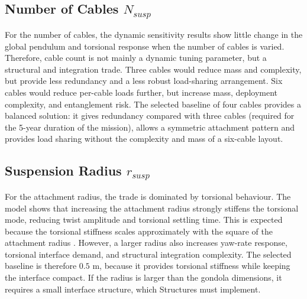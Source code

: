 \subsection{Number of Cables $N_{susp}$}
\label{subsec: Number of Cables}
For the number of cables, the dynamic sensitivity results show little change in the global pendulum and torsional response when the number of cables is varied. Therefore, cable count is not mainly a dynamic tuning parameter, but a structural and integration trade. Three cables would reduce mass and complexity, but provide less redundancy and a less robust load-sharing arrangement. Six cables would reduce per-cable loads further, but increase mass, deployment complexity, and entanglement risk. The selected baseline of four cables provides a balanced solution: it gives redundancy compared with three cables (required for the 5-year duration of the mission), allows a symmetric attachment pattern and provides load sharing without the complexity and mass of a six-cable layout.

\subsection{Suspension Radius $r_{susp}$}
\label{subsec: Suspension Radius}
For the attachment radius, the trade is dominated by torsional behaviour. The model shows that increasing the attachment radius strongly stiffens the torsional mode, reducing twist amplitude and torsional settling time. This is expected because the torsional stiffness scales approximately with the square of the attachment radius \cite{Kassarian2021BalloonDynamics}. However, a larger radius also increases yaw-rate response, torsional interface demand, and structural integration complexity. The selected baseline is therefore $0.5$ m, because it provides torsional stiffness while keeping the interface compact. If the radius is larger than the gondola dimensions, it requires a small interface structure, which Structures must implement.
  
